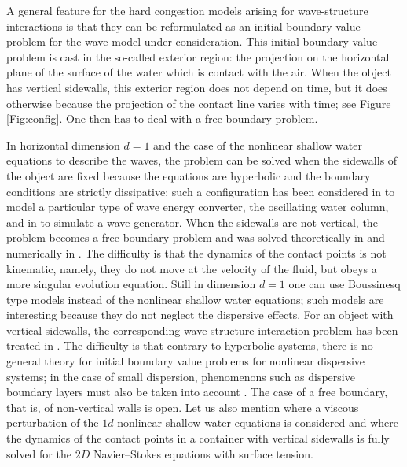 \documentclass[10pt]{amsart}
\theoremstyle{definition}
\begin{document}
A general feature for the hard congestion models arising for wave-structure interactions is that
they can be reformulated as an initial boundary value problem for the wave model under consideration.
This initial boundary value problem is cast in the so-called exterior region:
the projection on the horizontal plane of the surface of the water which is contact with the air.
When the object has vertical sidewalls, this exterior region does not depend on time,
but it does otherwise because the projection of the contact line varies with time; see Figure \ref{Fig:config}.
One then has to deal with a free boundary problem.

In horizontal dimension $d=1$ and the case of the nonlinear shallow water equations to describe the waves,
the problem can be solved when the sidewalls of the object are fixed because the equations are hyperbolic and the boundary conditions are strictly dissipative;
such a configuration has been considered in \cite{BocchiHeVergara} to model a particular type of wave energy converter, the oscillating water column,
and in \cite{SuTucsnak} to simulate a wave generator.
When the sidewalls are not vertical,
the problem becomes a free boundary problem and was solved theoretically in \cite{IguchiLannes2021} and numerically in \cite{HaidarMarcheVilar}.
The difficulty is that the dynamics of the contact points is not kinematic, namely, they do not move at the velocity of the fluid,
but obeys a more singular evolution equation.
Still in dimension $d=1$ one can use Boussinesq type models instead of the nonlinear shallow water equations;
such models are interesting because they do not neglect the dispersive effects.
For an object with vertical sidewalls,
the corresponding wave-structure interaction problem has been treated in \cite{BreschLannesMetivier,BeckLannes,BeckLannesWeynans}.
The difficulty is that contrary to hyperbolic systems, there is no general theory for initial boundary value problems for nonlinear dispersive systems;
in the case of small dispersion, phenomenons such as dispersive boundary layers must also be taken into account \cite{BreschLannesMetivier}.
The case of a free boundary, that is, of non-vertical walls is open.
Let us also mention \cite{MSTT} where a viscous perturbation of the $1d$ nonlinear shallow water equations is considered and \cite{GuoTice,GuoTiceZheng}
where the dynamics of the contact points in a container with vertical sidewalls is fully solved for the $2D$ Navier--Stokes equations with surface tension.
\end{document}
